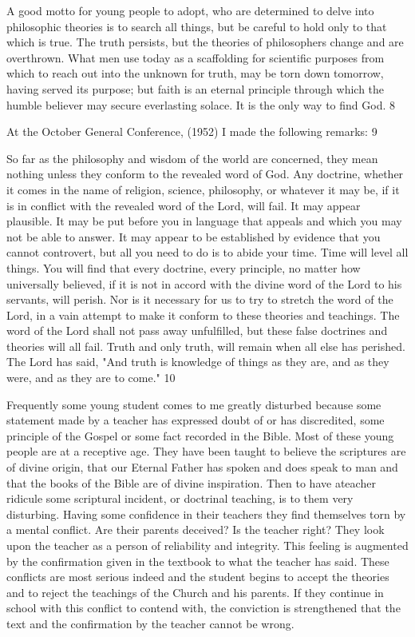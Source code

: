 A good motto for young people to adopt, who are determined to delve into philosophic
theories is to search all things, but be careful to hold only to that which is true. The truth
persists, but the theories of philosophers change and are overthrown. What men use today as
a scaffolding for scientific purposes from which to reach out into the unknown for truth, may
be torn down tomorrow, having served its purpose; but faith is an eternal principle through
which the humble believer may secure everlasting solace. It is the only way to find God. 8

At the October General Conference, (1952) I made the following remarks: 9

So far as the philosophy and wisdom of the world are concerned, they mean nothing unless
they conform to the revealed word of God. Any doctrine, whether it comes in the name of
religion, science, philosophy, or whatever it may be, if it is in conflict with the revealed word
of the Lord, will fail. It may appear plausible. It may be put before you in language that
appeals and which you may not be able to answer. It may appear to be established by
evidence that you cannot controvert, but all you need to do is to abide your time. Time will
level all things. You will find that every doctrine, every principle, no matter how universally
believed, if it is not in accord with the divine word of the Lord to his servants, will perish.
Nor is it necessary for us to try to stretch the word of the Lord, in a vain attempt to make it
conform to these theories and teachings. The word of the Lord shall not pass away
unfulfilled, but these false doctrines and theories will all fail. Truth and only truth, will
remain when all else has perished. The Lord has said, "And truth is knowledge of things as
they are, and as they were, and as they are to come." 10

Frequently some young student comes to me greatly disturbed because some statement made
by a teacher has expressed doubt of or has discredited, some principle of the Gospel or some
fact recorded in the Bible. Most of these young people are at a receptive age. They have been
taught to believe the scriptures are of divine origin, that our Eternal Father has spoken and
does speak to man and that the books of the Bible are of divine inspiration. Then to have ateacher ridicule some scriptural incident, or doctrinal teaching, is to them very disturbing.
Having some confidence in their teachers they find themselves torn by a mental conflict. Are
their parents deceived? Is the teacher right? They look upon the teacher as a person of
reliability and integrity. This feeling is augmented by the confirmation given in the textbook
to what the teacher has said. These conflicts are most serious indeed and the student begins to
accept the theories and to reject the teachings of the Church and his parents. If they continue
in school with this conflict to contend with, the conviction is strengthened that the text and
the confirmation by the teacher cannot be wrong.

